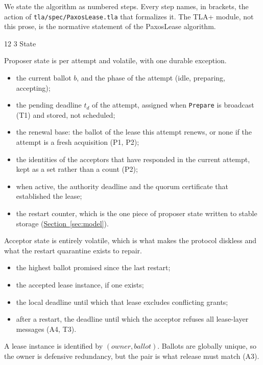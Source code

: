 \documentclass[final,5p,times,twocolumn,number]{elsarticle}
\makeatletter
\newcommand{\code}[1]{\texttt{#1}}
\newcommand{\secref}[1]{\hyperref[#1]{Section~\ref*{#1}}}
\renewcommand\subsection{\@startsection{subsection}{2}{\z@}%
           {12\p@ \@plus 6\p@ \@minus 3\p@}%
           {3\p@ \@plus 6\p@ \@minus 3\p@}%
           {\normalfont\normalsize\bfseries}}
\makeatother
\begin{document}
We state the algorithm as numbered steps.  Every step names, in brackets, the action of \code{tla/spec/PaxosLease.tla} that formalizes it.  The TLA+ module, not this prose, is the normative statement of the PaxosLease algorithm.

\subsection{State}

Proposer state is per attempt and volatile, with one durable exception.

\begin{itemize}\itemsep0.25em
\item the current ballot $b$, and the phase of the attempt (idle, preparing, accepting);
\item the pending deadline $t_d$ of the attempt, assigned when \code{Prepare} is broadcast (T1) and stored, not scheduled;
\item the renewal base: the ballot of the lease this attempt renews, or none if the attempt is a fresh acquisition (P1, P2);
\item the identities of the acceptors that have responded in the current attempt, kept as a set rather than a count (P2);
\item when active, the authority deadline and the quorum certificate that established the lease;
\item the restart counter, which is the one piece of proposer state written to stable storage (\secref{sec:model}).
\end{itemize}

Acceptor state is entirely volatile, which is what makes the protocol diskless and what the restart quarantine exists to repair.

\begin{itemize}\itemsep0.25em
\item the highest ballot promised since the last restart;
\item the accepted lease instance, if one exists;
\item the local deadline until which that lease excludes conflicting grants;
\item after a restart, the deadline until which the acceptor refuses all lease-layer messages (A4, T3).
\end{itemize}

A lease instance is identified by $(owner, ballot)$.  Ballots are globally unique, so the owner is defensive redundancy, but the pair is what release must match (A3).
\end{document}
